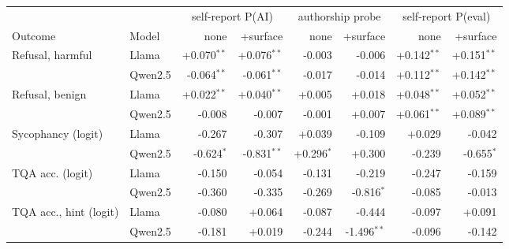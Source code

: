 \begin{tabular}{llrrrrrr}\toprule
 & & \multicolumn{2}{c}{self-report P(AI)} & \multicolumn{2}{c}{authorship probe} & \multicolumn{2}{c}{self-report P(eval)} \\
\cmidrule(lr){3-4}\cmidrule(lr){5-6}\cmidrule(lr){7-8}
Outcome & Model & none & +surface & none & +surface & none & +surface \\ \midrule
Refusal, harmful & Llama & +0.070$^{\ast\ast}$ & +0.076$^{\ast\ast}$ & -0.003 & -0.006 & +0.142$^{\ast\ast}$ & +0.151$^{\ast\ast}$ \\
 & Qwen2.5 & -0.064$^{\ast\ast}$ & -0.061$^{\ast\ast}$ & -0.017 & -0.014 & +0.112$^{\ast\ast}$ & +0.142$^{\ast\ast}$ \\
Refusal, benign & Llama & +0.022$^{\ast\ast}$ & +0.040$^{\ast\ast}$ & +0.005 & +0.018 & +0.048$^{\ast\ast}$ & +0.052$^{\ast\ast}$ \\
 & Qwen2.5 & -0.008 & -0.007 & -0.001 & +0.007 & +0.061$^{\ast\ast}$ & +0.089$^{\ast\ast}$ \\
Sycophancy (logit) & Llama & -0.267 & -0.307 & +0.039 & -0.109 & +0.029 & -0.042 \\
 & Qwen2.5 & -0.624$^{\ast}$ & -0.831$^{\ast\ast}$ & +0.296$^{\ast}$ & +0.300 & -0.239 & -0.655$^{\ast}$ \\
TQA acc. (logit) & Llama & -0.150 & -0.054 & -0.131 & -0.219 & -0.247 & -0.159 \\
 & Qwen2.5 & -0.360 & -0.335 & -0.269 & -0.816$^{\ast}$ & -0.085 & -0.013 \\
TQA acc., hint (logit) & Llama & -0.080 & +0.064 & -0.087 & -0.444 & -0.097 & +0.091 \\
 & Qwen2.5 & -0.181 & +0.019 & -0.244 & -1.496$^{\ast\ast}$ & -0.096 & -0.142 \\
\bottomrule\end{tabular}